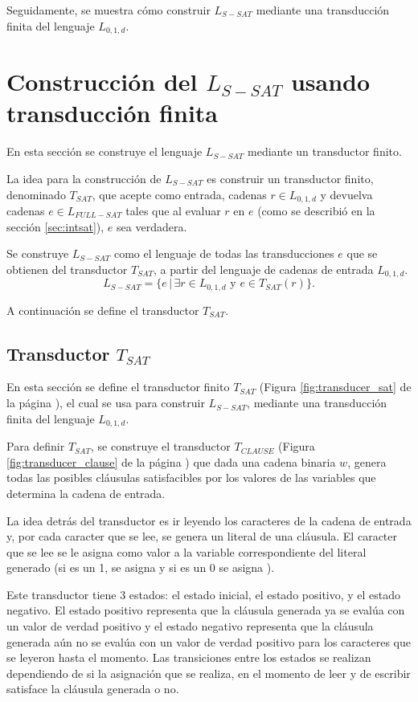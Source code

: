 Seguidamente, se muestra cómo construir $L_{S-SAT}$ mediante una transducción finita del lenguaje $L_{0,1,d}$.

\section{Construcción del $L_{S-SAT}$ usando transducción finita}

En esta sección se construye el lenguaje $L_{S-SAT}$ mediante un transductor finito.

La idea para la construcción de $L_{S-SAT}$ es construir un transductor finito, denominado $T_{SAT}$, que acepte como entrada, cadenas $r\in L_{0,1,d}$ y devuelva cadenas $e\in L_{FULL-SAT}$ tales que al evaluar $r$ en $e$ (como se describió en la sección \ref{sec:intsat}), $e$ sea verdadera.

Se construye $L_{S-SAT}$ como el lenguaje de todas las transducciones $e$ que se obtienen del transductor $T_{SAT}$, a partir del lenguaje de cadenas de entrada $L_{0,1,d}$.
$$L_{S-SAT} = \{e\,|\,\exists r \in L_{0,1,d} \text{ y } e \in T_{SAT}(r) \}.$$

A continuación se define el transductor $T_{SAT}$.

\subsection{Transductor $T_{SAT}$}
\label{sec:tsat}

En esta sección se define el transductor finito $T_{SAT}$ (Figura \ref{fig:transducer_sat} de la página \pageref{fig:transducer_sat}), el cual se usa para construir $L_{S-SAT}$, mediante una transducción finita del lenguaje $L_{0,1,d}$.

Para definir $T_{SAT}$, se construye el transductor $T_{CLAUSE}$ (Figura \ref{fig:transducer_clause} de la página \pageref{fig:transducer_clause}) que dada una cadena binaria $w$, genera todas las posibles cláusulas satisfacibles por los valores de las variables que determina la cadena de entrada.

La idea detrás del transductor es ir leyendo los caracteres de la cadena de entrada y, por cada caracter que se lee, se genera un literal de una cláusula. El caracter que se lee se le asigna como valor a la variable correspondiente del literal generado (si es un 1, se asigna \true{} y si es un 0 se asigna \false{}).

Este transductor tiene 3 estados: el estado inicial, el estado positivo, y el estado negativo.  
El estado positivo representa que la cláusula generada ya se evalúa con un valor de verdad positivo y 
el estado negativo representa que la cláusula generada aún no se evalúa con un valor de verdad positivo 
para los caracteres que se leyeron hasta el momento. Las transiciones entre los estados se realizan 
dependiendo de si la asignación que se realiza, en el momento de leer y de escribir satisface la cláusula 
generada o no.

